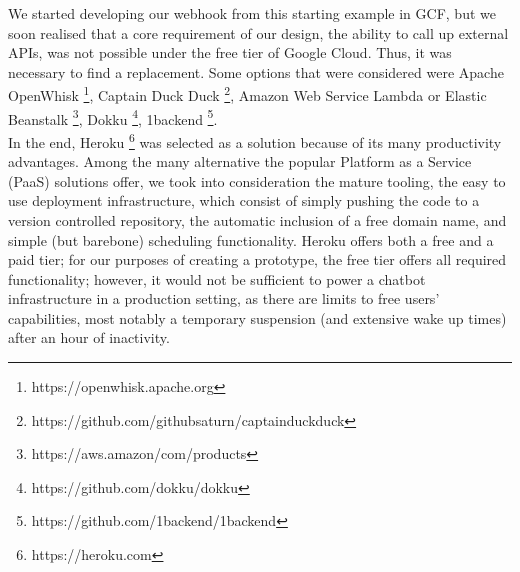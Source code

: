 We started developing our webhook from this starting example in GCF, but we soon realised that a core requirement of our design, the ability to call up external APIs, was not possible under the free tier of Google Cloud. Thus, it was necessary to find a replacement. Some options that were considered were Apache OpenWhisk \footnote{https://openwhisk.apache.org}, Captain Duck Duck \footnote{https://github.com/githubsaturn/captainduckduck}, Amazon Web Service Lambda or Elastic Beanstalk \footnote{https://aws.amazon/com/products}, Dokku \footnote{https://github.com/dokku/dokku}, 1backend \footnote{https://github.com/1backend/1backend}. \\
In the end, Heroku \footnote{https://heroku.com} was selected as a solution because of its many productivity advantages. Among the many alternative the popular Platform as a Service (PaaS) solutions offer, we took into consideration the mature tooling, the easy to use deployment infrastructure, which consist of simply pushing the code to a version controlled repository, the automatic inclusion of a free domain name, and simple (but barebone) scheduling functionality. Heroku offers both a free and a paid tier; for our purposes of creating a prototype, the free tier offers all required functionality; however, it would not be sufficient to power a chatbot infrastructure in a production setting, as there are limits to free users' capabilities, most notably a temporary suspension (and extensive wake up times) after an hour of inactivity.

